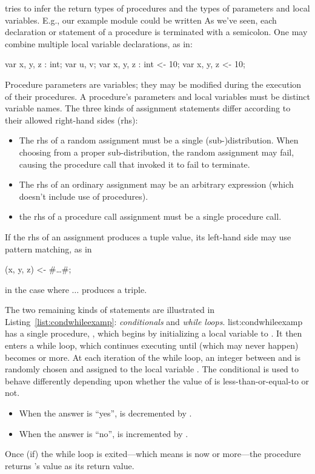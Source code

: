 \EasyCrypt tries to infer the return types of procedures and the
types of parameters and local variables. E.g., our example module
could be written  As we've seen, each
declaration or statement of a procedure is terminated with a
semicolon.  One may combine multiple local variable declarations, as
in:
\begin{easycrypt}{}{}
var x, y, z : int;
var u, v;
var x, y, z : int <- 10;
var x, y, z <- 10;
\end{easycrypt}
Procedure parameters are variables; they may be modified during the
execution of their procedures.  A procedure's parameters and local
variables must be distinct variable names.  The three kinds of
assignment statements differ according to their allowed right-hand
sides (rhs):
\begin{itemize}
\item The rhs of a random assignment must be a single
  (sub-)distribution. When choosing from a proper sub-distribution,
  the random assignment may fail, causing the procedure call that
  invoked it to fail to terminate.

\item The rhs of an ordinary assignment may be an arbitrary expression
  (which doesn't include use of procedures).

\item the rhs of a procedure call assignment must be a single procedure
  call.  
\end{itemize}
If the rhs of an assignment produces a tuple value, its left-hand side
may use pattern matching, as in
\begin{easycrypt}{}{}
(x, y, z) <- #\ldots#;
\end{easycrypt}
in the case where $\ldots$ produces a triple.

The two remaining kinds of statements are illustrated in
Listing~\ref{list:condwhileexamp}: \emph{conditionals} and \emph{while
  loops}.
 {}{list:condwhileexamp}
 has a single procedure,
, which begins by initializing a local variable  to
. It then enters a while loop, which continues executing until
(which may never happen)  becomes  or more. At each
iteration of the while loop, an integer between  and  is
randomly chosen and assigned to the local variable . The
conditional is used to behave differently depending upon whether the
value of  is less-than-or-equal-to  or not.
\begin{itemize}
\item When the answer is ``yes'',  is decremented by .

\item When the answer is ``no'',  is incremented by .
\end{itemize}
Once (if) the while loop is exited---which means  is now 
or more---the procedure returns 's value as its return value.

